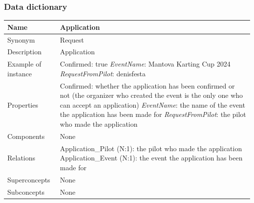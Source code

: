 \documentclass{beamer}
\begin{document}
\begin{frame}
\frametitle{Data dictionary}
\begin{table}
\tiny
\begin{tabular}{|p{2cm}|p{6cm}|}
\hline
Name & \textbf{Application} \\
\hline
Synonym & Request \\
\hline
Description & Application \\
\hline
Example of instance &
Confirmed: true \newline
\textit{EventName}: Mantova Karting Cup 2024 \newline
\textit{RequestFromPilot}: denisfesta \\
\hline
Properties &
Confirmed: whether the application has been confirmed or not (the organizer who
created the event is the
only one who can accept an application) \newline
\textit{EventName}: the name of the event the application has been made for \newline
\textit{RequestFromPilot}: the pilot who made the application \\
\hline
Components & None \\
\hline
Relations &
Application\_Pilot (N:1): the pilot who made the application \newline
Application\_Event (N:1): the event the application has been made for \\
\hline
Superconcepts & None \\
\hline
Subconcepts & None \\
\hline
\end{tabular}
\end{table}
\end{frame}
\end{document}
